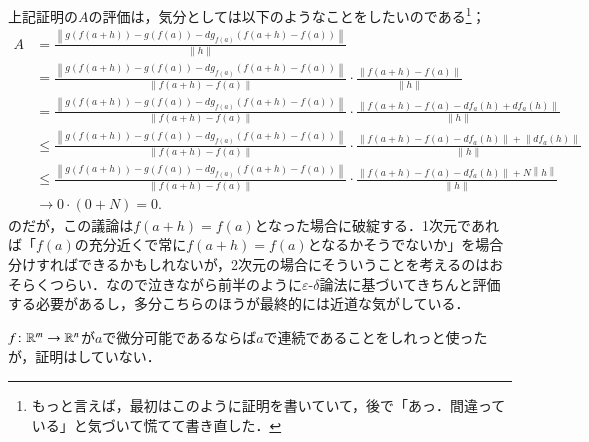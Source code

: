 \begin{dig}
上記証明の$A$の評価は，気分としては以下のようなことをしたいのである\footnote{もっと言えば，最初はこのように証明を書いていて，後で「あっ．間違っている」と気づいて慌てて書き直した．}；
\begin{align}
A &= \frac{\left\|g (f(a+h)) - g ( f(a) ) - dg_{f(a)} (f(a+h) - f(a))\right\|}{\|h\|} \\
&= \frac{\left\|g (f(a+h)) - g ( f(a) ) - dg_{f(a)} (f(a+h) - f(a))\right\|}{\|f(a+h) - f(a)\|} \cdot \frac{\|f(a+h) - f(a)\|}{\|h\|} \\
&= \frac{\left\|g (f(a+h)) - g ( f(a) ) - dg_{f(a)} (f(a+h) - f(a))\right\|}{\|f(a+h) - f(a)\|} \cdot \frac{\|f(a+h) - f(a) - df_a(h) + df_a(h)\|}{\|h\|} \\
&\leq \frac{\left\|g (f(a+h)) - g ( f(a) ) - dg_{f(a)} (f(a+h) - f(a))\right\|}{\|f(a+h) - f(a)\|} \cdot \frac{\left\|f(a+h) - f(a) - df_a(h) \right\| + \left\|df_a(h)\right\|}{\|h\|} \\
&\leq \frac{\left\|g (f(a+h)) - g ( f(a) ) - dg_{f(a)} (f(a+h) - f(a))\right\|}{\|f(a+h) - f(a)\|} \cdot \frac{\left\|f(a+h) - f(a) - df_a(h) \right\| + N\left\|h\right\|}{\|h\|} \\
& \to 0 \cdot (0+N) = 0.
\end{align}のだが，この議論は$f(a+h)=f(a)$となった場合に破綻する．1次元であれば「$f(a)$の充分近くで常に$f(a+h)=f(a)$となるかそうでないか」を場合分けすればできるかもしれないが，2次元の場合にそういうことを考えるのはおそらくつらい．なので泣きながら前半のように$\varepsilon$-$\delta$論法に基づいてきちんと評価する必要があるし，多分こちらのほうが最終的には近道な気がしている．
\end{dig}

\begin{que}
$f \colon \mathbb{R}^m \to \mathbb{R}^n$が$a$で微分可能であるならば$a$で連続であることをしれっと使ったが，証明はしていない．
\end{que}

